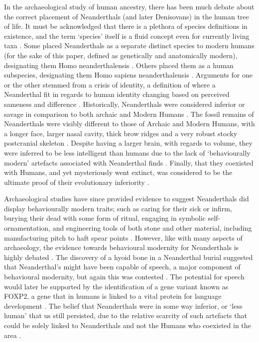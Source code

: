 In the  archaeological study of human ancestry, there has been much debate about the correct placement of Neanderthals (and later Denisovans) in the human tree of life. It must be acknowledged that there is a plethora of species definitions in existence, and the term ‘species’ itself is a fluid concept even for currently living taxa \parencite{DeQueiroz_2007}. Some placed Neanderthals as a separate distinct species to modern humans (for the sake of this paper, defined as genetically and anatomically modern), designating them Homo neanderthalensis \parencites{Harvati_2003}{White_2014}. Others placed them as a human subspecies, designating them Homo sapiens neanderthalensis \parencite{Churchill_2000}. Arguments for one or the other stemmed from a crisis of identity, a definition of where a Neanderthal fit in regards to human identity changing based on perceived sameness and difference \parencite{Harvati_2003}. Historically, Neanderthals were considered inferior or savage in comparison to both archaic and Modern Humans \parencites{Graves_1991}{King_1864}. The fossil remains of Neanderthals were visibly different to those of Archaic and Modern Humans, with a longer face, larger nasal cavity, thick brow ridges and a very robust stocky postcranial skeleton \parencite{White_2014}. Despite having a larger brain, with regards to volume, they were inferred to be less intelligent than humans due to the lack of ‘behaviourally modern’ artefacts associated with Neanderthal finds \parencite{Wynn_2008}. Finally, that they coexisted with Humans, and yet mysteriously went extinct, was considered to be the ultimate proof of their evolutionary inferiority \parencite{Graves_1991}. 

Archaeological studies have since provided evidence to suggest Neanderthals did display behaviourally modern traits; such as caring for their sick or infirm, burying their dead with some form of ritual, engaging in symbolic self-ornamentation, and engineering tools of both stone and other material, including manufacturing pitch to haft spear points \parencites{Spikins_2014}{Rendu_2014}{Villa_2010}. However, like with many aspects of archaeology, the evidence towards behavioural modernity for Neanderthals is highly debated \parencite{McGill_2015}. The discovery of a hyoid bone in a Neanderthal burial suggested that Neanderthal’s might have been capable of speech, a major component of behavioural modernity, but again this was contested \parencite{Lieberman_1993}. The potential for speech would later be supported by the identification of a gene variant known as FOXP2, a gene that in humans is linked to a vital protein for language development \parencite{Krause_2007}. The belief that Neanderthals were in some way inferior, or ‘less human’ that us still persisted, due to the relative scarcity of such artefacts that could be solely linked to Neanderthals and not the Humans who coexisted in the area \parencite{Mellars_2007}.

